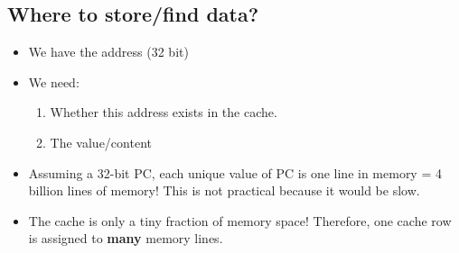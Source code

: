\documentclass[10pt]{article}
\begin{document}
\subsection*{Where to store/find data?}
\begin{itemize}
    \item We have the address (32 bit)
    \item We need:
    \begin{enumerate}
        \item Whether this address exists in the cache.
        \item The value/content
    \end{enumerate}
    \item Assuming a 32-bit PC, each unique value of PC is one line in memory = 4 billion lines of memory!  This is not practical because it would be slow.
    \item The cache is only a tiny fraction of memory space!  Therefore, one cache row is assigned to \textbf{many} memory lines.
\end{itemize}
\end{document}
